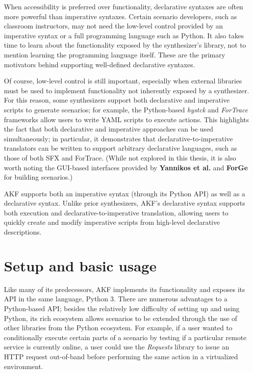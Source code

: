 When accessibility is preferred over functionality, declarative syntaxes
are often more powerful than imperative syntaxes. Certain scenario
developers, such as classroom instructors, may not need the low-level
control provided by an imperative syntax or a full programming language
such as Python. It also takes time to learn about the functionality
exposed by the synthesizer's library, not to mention learning the
programming language itself. These are the primary motivators behind
supporting well-defined declarative syntaxes.

Of course, low-level control is still important, especially when
external libraries must be used to implement functionality not
inherently exposed by a synthesizer. For this reason, some synthesizers
support both declarative and imperative scripts to generate scenarios;
for example, the Python-based \emph{hystck} and \emph{ForTrace}
frameworks allow users to write YAML scripts to execute actions. This
highlights the fact that both declarative and imperative approaches can
be used simultaneously; in particular, it demonstrates that
declarative-to-imperative translators can be written to support
arbitrary declarative languages, such as those of both SFX and ForTrace.
(While not explored in this thesis, it is also worth noting the
GUI-based interfaces provided by \textbf{Yannikos et al.} and
\textbf{ForGe} for building scenarios.)

AKF supports both an imperative syntax (through its Python API) as well
as a declarative syntax. Unlike prior synthesizers, AKF's declarative
syntax supports both execution and declarative-to-imperative
translation, allowing users to quickly create and modify imperative
scripts from high-level declarative descriptions.

\section{Setup and basic usage}\label{setup-and-basic-usage}

Like many of its predecessors, AKF implements its functionality and
exposes its API in the same language, Python 3. There are numerous
advantages to a Python-based API; besides the relatively low difficulty
of setting up and using Python, its rich ecosystem allows scenarios to
be extended through the use of other libraries from the Python
ecosystem. For example, if a user wanted to conditionally execute
certain parts of a scenario by testing if a particular remote service is
currently online, a user could use the \emph{Requests} library
\cite{Requests31Documentation} to issue an HTTP request out-of-band
before performing the same action in a virtualized environment.

